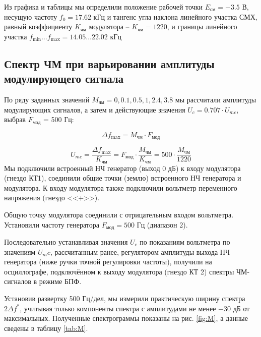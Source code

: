 \documentclass[a4paper,12pt]{article}
\begin{document}
Из графика и таблицы мы определили положение рабочей точки $E_\text{см}=-3.5$ В, несущую частоту $f_0=17.62$ кГц и тангенс угла наклона линейного участка СМХ, равный коэффициенту $K_\text{чм}$ модулятора -- $K_\text{чм}=1220$, и границы линейного участка $f_\text{min}\ldots f_\text{max}=14.05\ldots22.02$ кГц
				
\subsection{Спектр ЧМ при варьировании амплитуды модулирующего сигнала}

По ряду заданных значений $M_\text{чм}=0,0.1,0.5,1,2.4,3.8$ мы рассчитали амплитуды модулирующих сигналов, а затем и действующие значения $U_c=0.707\cdot U_{mc}$, выбрав $F_\text{мод}$ = 500 Гц:

\begin{equation}
	\Delta f_\text{max} = M_\text{чм}\cdot F_\text{мод}
\end{equation}

\begin{equation}
	U_{mc}=\frac{\Delta f_\text{max}}{K_\text{чм}}=
	F_\text{мод}\cdot\frac{M_\text{чм}}{K_\text{чм}}=500\cdot\frac{M_\text{чм}}{1220}
\end{equation}
\vspace{1em}					
Мы подключили встроенный НЧ генератор (выход 0 дБ) к входу модулятора (гнездо КТ1), соединили общие точки (землю) встроенного НЧ генератора и модулятора. К входу модулятора также подключили вольтметр переменного напряжения (гнездо <<+>>).

Общую точку модулятора соединили с отрицательным входом вольтметра. 
Установили частоту генератора $F_\text{мод} = 500$ Гц (диапазон 2).

Последовательно устанавливая значения $U_c$ по показаниям вольтметра по значениям $U_mc$, рассчитанным ранее, регулятором амплитуды выхода НЧ генератора (ниже ручки точной регулировки частоты), получили на осциллографе, подключённом к выходу модулятора (гнездо КТ 2) спектры ЧМ-сигналов в режиме БПФ. 

Установив развертку 500 Гц/дел, мы измерили практическую ширину спектра  $2\Delta f^*$, учитывая только компоненты спектра с  амплитудами не менее $-30$ дБ от максимальных. Полученные спектрограммы показаны на рис. \ref{fig:M}, а данные сведены в таблицу \ref{tab:M}.
\end{document}
